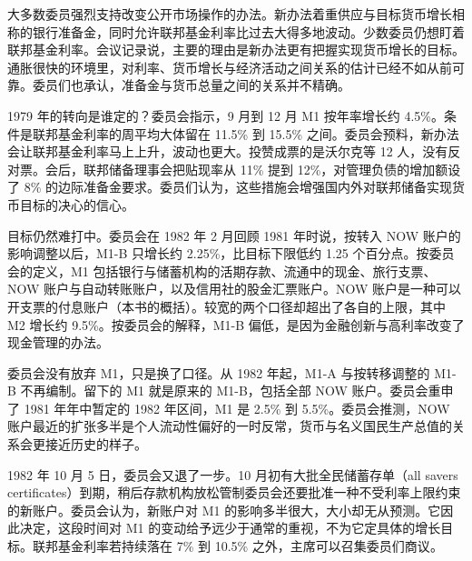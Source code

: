 大多数委员强烈支持改变公开市场操作的办法\cite{fomc1979}。新办法着重供应与目标货币增长相称的银行准备金，同时允许联邦基金利率比过去大得多地波动\cite{fomc1979}。少数委员仍想盯着联邦基金利率\cite{fomc1979}。会议记录说，主要的理由是新办法更有把握实现货币增长的目标\cite{fomc1979}。通胀很快的环境里，对利率、货币增长与经济活动之间关系的估计已经不如从前可靠\cite{fomc1979}。委员们也承认，准备金与货币总量之间的关系并不精确\cite{fomc1979}。

1979 年的转向是谁定的？委员会指示，9 月到 12 月 M1 按年率增长约 4.5\%\cite{fomc1979}。条件是联邦基金利率的周平均大体留在 11.5\% 到 15.5\% 之间\cite{fomc1979}。委员会预料，新办法会让联邦基金利率马上上升，波动也更大\cite{fomc1979}。投赞成票的是沃尔克等 12 人，没有反对票\cite{fomc1979}。会后，联邦储备理事会把贴现率从 11\% 提到 12\%，对管理负债的增加额设了 8\% 的边际准备金要求\cite{fomc1979}。委员们认为，这些措施会增强国内外对联邦储备实现货币目标的决心的信心\cite{fomc1979}。

目标仍然难打中。委员会在 1982 年 2 月回顾 1981 年时说，按转入 NOW 账户的影响调整以后，M1-B 只增长约 2.25\%，比目标下限低约 1.25 个百分点\cite{fomc1982a}。按委员会的定义，M1 包括银行与储蓄机构的活期存款、流通中的现金、旅行支票、NOW 账户与自动转账账户，以及信用社的股金汇票账户\cite{fomc1982a}。NOW 账户是一种可以开支票的付息账户（本书的概括）。较宽的两个口径却超出了各自的上限，其中 M2 增长约 9.5\%\cite{fomc1982a}。按委员会的解释，M1-B 偏低，是因为金融创新与高利率改变了现金管理的办法\cite{fomc1982a}。

委员会没有放弃 M1，只是换了口径。从 1982 年起，M1-A 与按转移调整的 M1-B 不再编制\cite{fomc1982a}。留下的 M1 就是原来的 M1-B，包括全部 NOW 账户\cite{fomc1982a}。委员会重申了 1981 年年中暂定的 1982 年区间，M1 是 2.5\% 到 5.5\%\cite{fomc1982a}。委员会推测，NOW 账户最近的扩张多半是个人流动性偏好的一时反常，货币与名义国民生产总值的关系会更接近历史的样子\cite{fomc1982a}。

1982 年 10 月 5 日，委员会又退了一步\cite{fomc1982b}。10 月初有大批全民储蓄存单（all savers certificates）到期，稍后存款机构放松管制委员会还要批准一种不受利率上限约束的新账户\cite{fomc1982b}。委员会认为，新账户对 M1 的影响多半很大，大小却无从预测\cite{fomc1982b}。它因此决定，这段时间对 M1 的变动给予远少于通常的重视，不为它定具体的增长目标\cite{fomc1982b}。联邦基金利率若持续落在 7\% 到 10.5\% 之外，主席可以召集委员们商议\cite{fomc1982b}。

